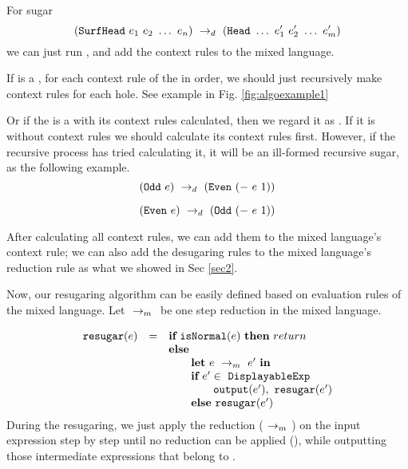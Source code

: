 For sugar 
\[
(\mbox{\tt SurfHead}~e_1~e_2~\ldots~e_n) ~\rightarrow_d~ (\mbox{\tt Head}~\ldots~e_1'~e_2'~\ldots~e_m')
\]
we can just  run , and add the context rules to the mixed language.


If  is a , for each context rule of the  in order, we should just recursively make context rules for each hole. See example in Fig.  \ref{fig:algoexample1}

Or if the  is a  with its context rules calculated, then we regard it as . If it is without context rules we should calculate its context rules first. However, if the recursive process has tried calculating it, it will be an ill-formed recursive sugar, as the following example.
\[
(\mbox{\tt Odd}~e) ~\rightarrow_d~ (\mbox{\tt Even}~(-~e~1))
\]

\[
(\mbox{\tt Even}~e) ~\rightarrow_d~ (\mbox{\tt Odd}~(-~e~1))
\]

After calculating all context rules, we can add them to the mixed language's context rule; we can also add the desugaring rules to the mixed language's reduction rule as what we showed in Sec \ref{sec2}.


Now, our resugaring algorithm can be easily defined based on evaluation rules of the mixed language.  Let $~\rightarrow_m~$ be one step reduction in the mixed language.

\[
\begin{array}{llll}
\mbox{\tt resugar} (e) &=& \mbox{\rm \bf if}~\mbox{\tt isNormal}(e)~\mbox{\rm \bf then}~return\\
              & & \mbox{\rm \bf else}~\\
							& & \qquad \mbox{\rm \bf let}~e ~\rightarrow_m~e'~\mbox{\rm \bf in}\\
							& & \qquad \mbox{\rm \bf if}~e' \in~\mbox{\tt DisplayableExp} \\
							& & \qquad \qquad \mbox{\tt output}(e'),~\mbox{\tt resugar}(e')\\
							& & \qquad \mbox{\rm \bf else}~\mbox{\tt resugar}(e')
\end{array}
\]
During the resugaring, we just apply the reduction ($~\rightarrow_m~$) on the input expression step by step until no reduction can be applied (), while outputting those intermediate expressions that belong to .


